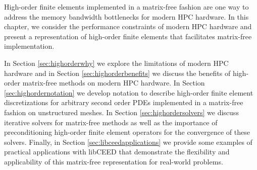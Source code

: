 High-order finite elements implemented in a matrix-free fashion are one way to address the memory bandwidth bottlenecks for modern HPC hardware.
In this chapter, we consider the performance constraints of modern HPC hardware and present a representation of high-order finite elements that facilitates matrix-free implementation.

In Section \ref{sec:highorderwhy} we explore the limitations of modern HPC hardware and in Section \ref{sec:highorderbenefits} we discuss the benefits of high-order matrix-free methods on modern HPC hardware.
In Section \ref{sec:highordernotation} we develop notation to describe high-order finite element discretizations for arbitrary second order PDEs implemented in a matrix-free fashion on unstructured meshes.
In Section \ref{sec:highordersolvers} we discuss iterative solvers for matrix-free methods as well as the importance of preconditioning high-order finite element operators for the convergence of these solvers.
Finally, in Section \ref{sec:libceedapplications} we provide some examples of practical applications with libCEED that demonstrate the flexibility and applicability of this matrix-free representation for real-world problems.
